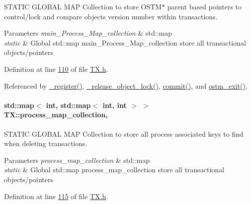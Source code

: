 S\+T\+A\+T\+IC G\+L\+O\+B\+AL M\+AP Collection to store O\+S\+T\+M$\ast$ parent based pointers to control/lock and compare objects version number within transactions. 


\begin{DoxyParams}{Parameters}
{\em main\+\_\+\+Process\+\_\+\+Map\+\_\+collection} & std\+::map\\
\hline
{\em static} & Global std\+::map main\+\_\+\+Process\+\_\+\+Map\+\_\+collection store all transactional objects/pointers \\
\hline
\end{DoxyParams}


Definition at line \hyperlink{_t_x_8h_source_l00110}{110} of file \hyperlink{_t_x_8h_source}{T\+X.\+h}.



Referenced by \hyperlink{_t_x_8cpp_source_l00104}{\+\_\+register()}, \hyperlink{_t_x_8cpp_source_l00286}{\+\_\+release\+\_\+object\+\_\+lock()}, \hyperlink{_t_x_8cpp_source_l00202}{commit()}, and \hyperlink{_t_x_8cpp_source_l00072}{ostm\+\_\+exit()}.

\paragraph[{\texorpdfstring{process\+\_\+map\+\_\+collection}{process_map_collection}}]{\setlength{\rightskip}{0pt plus 5cm}std\+::map$<$ int, std\+::map$<$ int, int $>$ $>$ T\+X\+::process\+\_\+map\+\_\+collection\hspace{0.3cm}{\ttfamily [static]}, {\ttfamily [private]}}\hypertarget{class_t_x_aea5b8eedcd5059384155576b3979a5f6_aea5b8eedcd5059384155576b3979a5f6}{}\label{class_t_x_aea5b8eedcd5059384155576b3979a5f6_aea5b8eedcd5059384155576b3979a5f6}


S\+T\+A\+T\+IC G\+L\+O\+B\+AL M\+AP Collection to store all process associated keys to find when deleting transactions. 


\begin{DoxyParams}{Parameters}
{\em process\+\_\+map\+\_\+collection} & std\+::map\\
\hline
{\em static} & Global std\+::map process\+\_\+map\+\_\+collection store all transactional objects/pointers \\
\hline
\end{DoxyParams}


Definition at line \hyperlink{_t_x_8h_source_l00115}{115} of file \hyperlink{_t_x_8h_source}{T\+X.\+h}.



